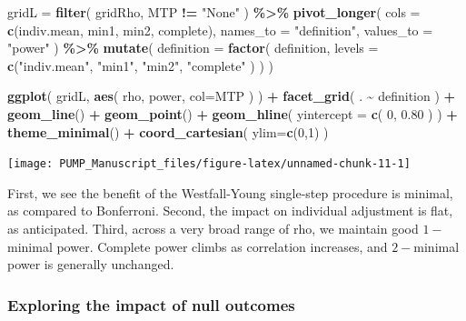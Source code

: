 \documentclass[
]{article}
\newenvironment{Shaded}{\begin{snugshade}}{\end{snugshade}}
\newcommand{\DataTypeTok}[1]{\textcolor[rgb]{0.13,0.29,0.53}{#1}}
\newcommand{\DecValTok}[1]{\textcolor[rgb]{0.00,0.00,0.81}{#1}}
\newcommand{\FloatTok}[1]{\textcolor[rgb]{0.00,0.00,0.81}{#1}}
\newcommand{\KeywordTok}[1]{\textcolor[rgb]{0.13,0.29,0.53}{\textbf{#1}}}
\newcommand{\NormalTok}[1]{#1}
\newcommand{\OperatorTok}[1]{\textcolor[rgb]{0.81,0.36,0.00}{\textbf{#1}}}
\newcommand{\StringTok}[1]{\textcolor[rgb]{0.31,0.60,0.02}{#1}}
\begin{document}
\begin{Shaded}
\begin{Highlighting}[]
\NormalTok{gridL =}\StringTok{ }\KeywordTok{filter}\NormalTok{( gridRho, MTP }\OperatorTok{!=}\StringTok{ "None"}\NormalTok{ ) }\OperatorTok{\%\textgreater{}\%}
\StringTok{  }\KeywordTok{pivot\_longer}\NormalTok{( }\DataTypeTok{cols =} \KeywordTok{c}\NormalTok{(indiv.mean, min1, min2, complete),}
                \DataTypeTok{names\_to =} \StringTok{"definition"}\NormalTok{, }\DataTypeTok{values\_to =} \StringTok{"power"}\NormalTok{ ) }\OperatorTok{\%\textgreater{}\%}
\StringTok{  }\KeywordTok{mutate}\NormalTok{( }\DataTypeTok{definition =} \KeywordTok{factor}\NormalTok{( definition,}
                            \DataTypeTok{levels =} \KeywordTok{c}\NormalTok{(}\StringTok{"indiv.mean"}\NormalTok{, }\StringTok{"min1"}\NormalTok{, }\StringTok{"min2"}\NormalTok{, }\StringTok{"complete"}\NormalTok{ ) ) )}

\KeywordTok{ggplot}\NormalTok{( gridL, }\KeywordTok{aes}\NormalTok{( rho, power, }\DataTypeTok{col=}\NormalTok{MTP ) ) }\OperatorTok{+}
\StringTok{  }\KeywordTok{facet\_grid}\NormalTok{( . }\OperatorTok{\textasciitilde{}}\StringTok{ }\NormalTok{definition ) }\OperatorTok{+}
\StringTok{  }\KeywordTok{geom\_line}\NormalTok{() }\OperatorTok{+}\StringTok{ }\KeywordTok{geom\_point}\NormalTok{() }\OperatorTok{+}
\StringTok{  }\KeywordTok{geom\_hline}\NormalTok{( }\DataTypeTok{yintercept =} \KeywordTok{c}\NormalTok{( }\DecValTok{0}\NormalTok{, }\FloatTok{0.80}\NormalTok{ ) ) }\OperatorTok{+}\StringTok{ }
\StringTok{  }\KeywordTok{theme\_minimal}\NormalTok{() }\OperatorTok{+}
\StringTok{  }\KeywordTok{coord\_cartesian}\NormalTok{( }\DataTypeTok{ylim=}\KeywordTok{c}\NormalTok{(}\DecValTok{0}\NormalTok{,}\DecValTok{1}\NormalTok{) )}
\end{Highlighting}
\end{Shaded}

\begin{center}\texttt{[image: PUMP\_Manuscript\_files/figure-latex/unnamed-chunk-11-1]} \end{center}

First, we see the benefit of the Westfall-Young single-step procedure is
minimal, as compared to Bonferroni. Second, the impact on individual
adjustment is flat, as anticipated. Third, across a very broad range of
rho, we maintain good \(1-\)minimal power. Complete power climbs as
correlation increases, and \(2-\)minimal power is generally unchanged.

\subsubsection{Exploring the impact of null outcomes}
\end{document}
